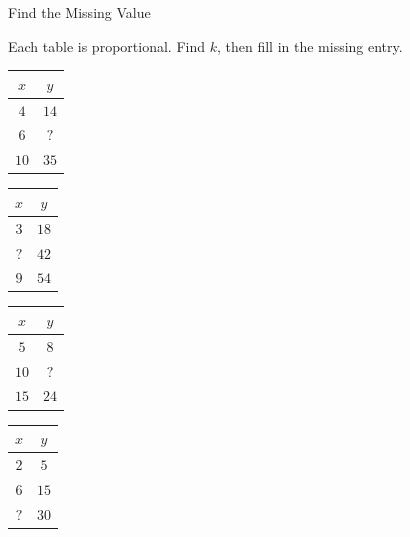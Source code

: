 \begin{findMissingBox}{Find the Missing Value}

Each table is proportional. Find $k$, then fill in the missing entry.

\prob \begin{center}
\begin{tabular}{|c|c|}
\hline $x$ & $y$ \\ \hline $4$ & $14$ \\ $6$ & $?$ \\ $10$ & $35$ \\ \hline
\end{tabular}
\end{center}

\prob \begin{center}
\begin{tabular}{|c|c|}
\hline $x$ & $y$ \\ \hline $3$ & $18$ \\ $?$ & $42$ \\ $9$ & $54$ \\ \hline
\end{tabular}
\end{center}

\prob \begin{center}
\begin{tabular}{|c|c|}
\hline $x$ & $y$ \\ \hline $5$ & $8$ \\ $10$ & $?$ \\ $15$ & $24$ \\ \hline
\end{tabular}
\end{center}

\prob \begin{center}
\begin{tabular}{|c|c|}
\hline $x$ & $y$ \\ \hline $2$ & $5$ \\ $6$ & $15$ \\ $?$ & $30$ \\ \hline
\end{tabular}
\end{center}

\end{findMissingBox}

